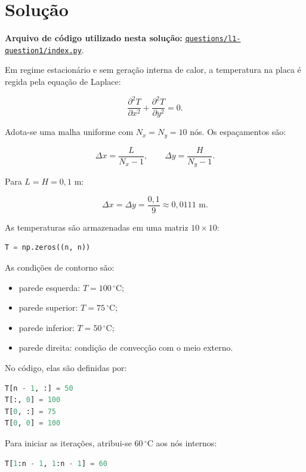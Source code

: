 \documentclass[
    12pt,
    oneside,
    a4paper,
    english,
    brazilian,
    chapter=TITLE,
    sumario=tradicional
]{abntex2}
\newcommand{\linkcodigo}[2]{%
    \par\noindent\textbf{Arquivo de código utilizado nesta solução: }
    \href{#1}{\nolinkurl{#2}}.\par
}
\begin{document}
\newpage

\section{Solução}

\linkcodigo
{https://github.com/kauanpecanha/Faculdade/blob/master/MEDO2/trabalho1/questions/l1-question1/index.py}
{questions/l1-question1/index.py}

Em regime estacionário e sem geração interna de calor, a temperatura na placa
é regida pela equação de Laplace:

\[
    \frac{\partial^2 T}{\partial x^2}
    +
    \frac{\partial^2 T}{\partial y^2}
    = 0.
\]

Adota-se uma malha uniforme com $N_x=N_y=10$ nós. Os espaçamentos são:

\[
    \Delta x = \frac{L}{N_x-1},
    \qquad
    \Delta y = \frac{H}{N_y-1}.
\]

Para $L=H=0{,}1$ m:

\[
    \Delta x = \Delta y
    =
    \frac{0{,}1}{9}
    \approx 0{,}0111 \text{ m}.
\]

As temperaturas são armazenadas em uma matriz $10 \times 10$:

\begin{lstlisting}[language=Python]
T = np.zeros((n, n))
\end{lstlisting}

As condições de contorno são:

\begin{itemize}
    \item parede esquerda: $T=100\,^\circ$C;
    \item parede superior: $T=75\,^\circ$C;
    \item parede inferior: $T=50\,^\circ$C;
    \item parede direita: condição de convecção com o meio externo.
\end{itemize}

No código, elas são definidas por:

\begin{lstlisting}[language=Python]
T[n - 1, :] = 50
T[:, 0] = 100
T[0, :] = 75
T[0, 0] = 100
\end{lstlisting}

Para iniciar as iterações, atribui-se $60\,^\circ$C aos nós internos:

\begin{lstlisting}[language=Python]
T[1:n - 1, 1:n - 1] = 60
\end{lstlisting}
\end{document}
